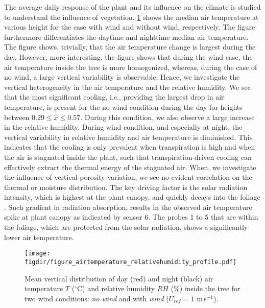 The average daily response of the plant and its influence on the climate is studied to understand the influence of vegetation. \cref{fig:figure_airtemperature_relativehumidity_profile} shows the median air temperature at various height for the case with wind and without wind, respectively. The figure furthermore differentiates the daytime and nighttime median air temperature. The figure shows, trivially, that the air temperature change is largest during the day. However, more interesting, the figure shows that during the wind case, the air temperature inside the tree is more homogenized, whereas, during the case of no wind, a large vertical variability is observable. Hence, we investigate the vertical heterogeneity in the air temperature and the relative humidity. We see that the most significant cooling, i.e., providing the largest drop in air temperature, is present for the no wind condition during the day for heights between $0.29\le\hat{x}\le0.57$. During this condition, we also observe a large increase in the relative humidity. During wind condition, and especially at night, the vertical variability in relative humidity and air temperature is diminished. This indicates that the cooling is only prevalent when transpiration is high and when the air is stagnated inside the plant, such that transpiration-driven cooling can effectively extract the thermal energy of the stagnated air. When, we investigate the influence of vertical porosity variation, we see no evident correlation on the thermal or moisture distribution. The key driving factor is the solar radiation intensity, which is highest at the plant canopy, and quickly decays into the foliage \citep{Manickathan2018a}. Such gradient in radiation absorption, results in the observed air temperature spike at plant canopy as indicated by sensor 6. The probes 1 to 5 that are within the foliage, which are protected from the solar radiation, shows a significantly lower air temperature.

	\begin{figure}[t]
	\centering
	\texttt{[image: \\figdir/figure\_airtemperature\_relativehumidity\_profile.pdf]}
	\caption{Mean vertical distribution of day (red) and night (black)  air temperature $T$ ($^{\circ}$C) and  relative humidity $RH$ (\%) inside the tree for two wind conditions:  \textit{no wind} and  with \textit{wind} ($U_{ref}=1$ m\,s$^{-1}$).}
	\label{fig:figure_airtemperature_relativehumidity_profile}
	\end{figure}


